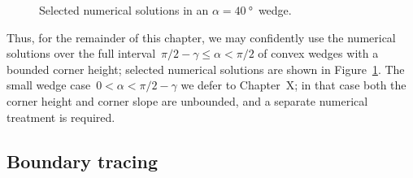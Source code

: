 \begin{figure}
  \newcommand*{\subfigurewidth}{0.45\textwidth}
  \centering
  \hspace*{\fill}
  \begin{subfigure}[t]{\subfigurewidth}
  \end{subfigure}
    \hfill
  \begin{subfigure}[t]{\subfigurewidth}
  \end{subfigure}
  \hspace*{\fill}
  \caption{
    Selected numerical solutions in an $\alpha = \SI{40}{\degree}$~wedge.
  }
  \label{fig:wedge_acute-solution}
\end{figure}

Thus, for the remainder of this chapter,
we may confidently use the numerical solutions
over the full interval~$\pi/2 - \gamma \le \alpha < \pi/2$
of convex wedges with a bounded corner height;
selected numerical solutions are shown
in Figure~\ref{fig:wedge_acute-solution}.
The small wedge case~$0 < \alpha < \pi/2 - \gamma$
we defer to Chapter~X; %
in that case both the corner height and corner slope are unbounded,
and a separate numerical treatment is required.

\subsection{Boundary tracing}
\label{sec:moderate.nonlinear.tracing}

